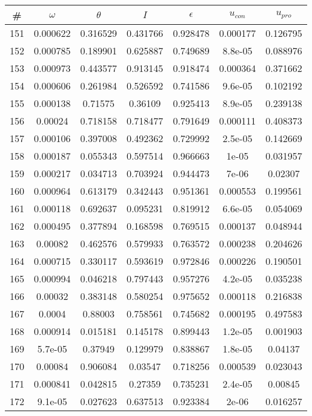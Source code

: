 \newpage
\begin{table}
\begin{tabular}{c|c|c|c|c|c|c}
\# & $\omega$ & $\theta$ & $I$ & $\epsilon$ & $u_{con}$ & $u_{pro}$\\
\hline
151 & 0.000622 & 0.316529 & 0.431766 & 0.928478 & 0.000177 & 0.126795\\
152 & 0.000785 & 0.189901 & 0.625887 & 0.749689 & 8.8e-05 & 0.088976\\
153 & 0.000973 & 0.443577 & 0.913145 & 0.918474 & 0.000364 & 0.371662\\
154 & 0.000606 & 0.261984 & 0.526592 & 0.741586 & 9.6e-05 & 0.102192\\
155 & 0.000138 & 0.71575 & 0.36109 & 0.925413 & 8.9e-05 & 0.239138\\
156 & 0.00024 & 0.718158 & 0.718477 & 0.791649 & 0.000111 & 0.408373\\
157 & 0.000106 & 0.397008 & 0.492362 & 0.729992 & 2.5e-05 & 0.142669\\
158 & 0.000187 & 0.055343 & 0.597514 & 0.966663 & 1e-05 & 0.031957\\
159 & 0.000217 & 0.034713 & 0.703924 & 0.944473 & 7e-06 & 0.02307\\
160 & 0.000964 & 0.613179 & 0.342443 & 0.951361 & 0.000553 & 0.199561\\
161 & 0.000118 & 0.692637 & 0.095231 & 0.819912 & 6.6e-05 & 0.054069\\
162 & 0.000495 & 0.377894 & 0.168598 & 0.769515 & 0.000137 & 0.048944\\
163 & 0.00082 & 0.462576 & 0.579933 & 0.763572 & 0.000238 & 0.204626\\
164 & 0.000715 & 0.330117 & 0.593619 & 0.972846 & 0.000226 & 0.190501\\
165 & 0.000994 & 0.046218 & 0.797443 & 0.957276 & 4.2e-05 & 0.035238\\
166 & 0.00032 & 0.383148 & 0.580254 & 0.975652 & 0.000118 & 0.216838\\
167 & 0.0004 & 0.88003 & 0.758561 & 0.745682 & 0.000195 & 0.497583\\
168 & 0.000914 & 0.015181 & 0.145178 & 0.899443 & 1.2e-05 & 0.001903\\
169 & 5.7e-05 & 0.37949 & 0.129979 & 0.838867 & 1.8e-05 & 0.04137\\
170 & 0.00084 & 0.906084 & 0.03547 & 0.718256 & 0.000539 & 0.023043\\
171 & 0.000841 & 0.042815 & 0.27359 & 0.735231 & 2.4e-05 & 0.00845\\
172 & 9.1e-05 & 0.027623 & 0.637513 & 0.923384 & 2e-06 & 0.016257\\

\end{tabular}
\end{table}

